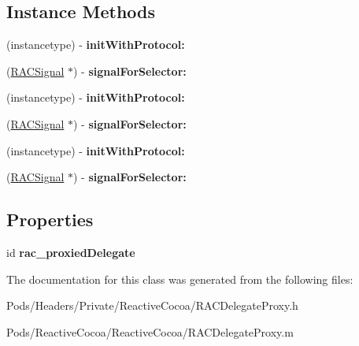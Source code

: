\subsection*{Instance Methods}
\begin{DoxyCompactItemize}
\item 
\mbox{\label{interface_r_a_c_delegate_proxy_a9709d62f0414505f18bb5747bb4bda56}} 
(instancetype) -\/ {\bfseries init\+With\+Protocol\+:}
\item 
\mbox{\label{interface_r_a_c_delegate_proxy_a6899797ac46da88542d6e9c4aa804d2c}} 
(\mbox{\hyperlink{interface_r_a_c_signal}{R\+A\+C\+Signal}} $\ast$) -\/ {\bfseries signal\+For\+Selector\+:}
\item 
\mbox{\label{interface_r_a_c_delegate_proxy_a9709d62f0414505f18bb5747bb4bda56}} 
(instancetype) -\/ {\bfseries init\+With\+Protocol\+:}
\item 
\mbox{\label{interface_r_a_c_delegate_proxy_a6899797ac46da88542d6e9c4aa804d2c}} 
(\mbox{\hyperlink{interface_r_a_c_signal}{R\+A\+C\+Signal}} $\ast$) -\/ {\bfseries signal\+For\+Selector\+:}
\item 
\mbox{\label{interface_r_a_c_delegate_proxy_a9709d62f0414505f18bb5747bb4bda56}} 
(instancetype) -\/ {\bfseries init\+With\+Protocol\+:}
\item 
\mbox{\label{interface_r_a_c_delegate_proxy_a6899797ac46da88542d6e9c4aa804d2c}} 
(\mbox{\hyperlink{interface_r_a_c_signal}{R\+A\+C\+Signal}} $\ast$) -\/ {\bfseries signal\+For\+Selector\+:}
\end{DoxyCompactItemize}
\subsection*{Properties}
\begin{DoxyCompactItemize}
\item 
\mbox{\label{interface_r_a_c_delegate_proxy_a0bbe042a887e22ae3cb4d68472b758a3}} 
id {\bfseries rac\+\_\+proxied\+Delegate}
\end{DoxyCompactItemize}


The documentation for this class was generated from the following files\+:\begin{DoxyCompactItemize}
\item 
Pods/\+Headers/\+Private/\+Reactive\+Cocoa/R\+A\+C\+Delegate\+Proxy.\+h\item 
Pods/\+Reactive\+Cocoa/\+Reactive\+Cocoa/R\+A\+C\+Delegate\+Proxy.\+m\end{DoxyCompactItemize}
